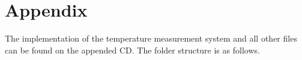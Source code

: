 \chapter{Appendix}
The implementation of the temperature measurement system and all other files can be found on the appended CD. The folder structure is as follows.